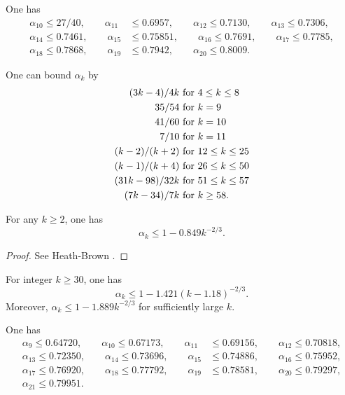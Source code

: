 \begin{theorem}\cite{ivic_ouellet_1989} One has
\begin{align*}
\alpha_{10} \le 27/40,\qquad \alpha_{11} &\le 0.6957,\qquad \alpha_{12} \le 0.7130,\qquad \alpha_{13} \le 0.7306,\\
\alpha_{14} \le 0.7461,\qquad \alpha_{15} &\le 0.75851,\qquad \alpha_{16} \le 0.7691,\qquad \alpha_{17} \le 0.7785,\\
\alpha_{18} \le 0.7868,\qquad \alpha_{19} &\le 0.7942,\qquad \alpha_{20} \le 0.8009.
\end{align*}
\end{theorem}
\begin{theorem}\cite[Theorem 13.12]{ivic}  One can bound $\alpha_k$ by
    \begin{align*}
        (3k-4)/4k & \hbox{ for } 4 \leq k \leq 8 \\
        35/54 & \hbox{ for } k = 9 \\
        41/60 & \hbox{ for } k = 10 \\
        7/10 & \hbox{ for } k = 11 \\
        (k-2)/(k+2) & \hbox{ for } 12 \leq k \leq 25 \\
        (k-1)/(k+4) & \hbox{ for } 26 \leq k \leq 50 \\
        (31k-98)/32k & \hbox{ for } 51 \leq k \leq 57 \\
        (7k-34)/7k & \hbox{ for } k \geq 58.
    \end{align*}
\end{theorem}

\begin{lemma}\label{hb-alpha-large}
For any $k \ge 2$, one has
\[
\alpha_k \le 1 - 0.849k^{-2/3}.
\]
\end{lemma}
\begin{proof}
See Heath-Brown \cite{heathbrown_new_2017}.
\end{proof}

\begin{theorem}For integer $k \ge 30$, one has
\[
\alpha_k \leq 1 - 1.421(k - 1.18)^{-2/3}.
\]
Moreover, $\alpha_k \leq 1 - 1.889k^{-2/3}$ for sufficiently large $k$.
\end{theorem}

\begin{theorem}One has
\begin{align*}
\alpha_{9} \le 0.64720,\qquad \alpha_{10} \le 0.67173,\qquad \alpha_{11} &\le 0.69156,\qquad \alpha_{12} \le 0.70818,\\
\alpha_{13} \le 0.72350, \qquad \alpha_{14} \le 0.73696,\qquad \alpha_{15} &\le 0.74886,\qquad \alpha_{16} \le 0.75952,\\
\alpha_{17} \le 0.76920, \qquad \alpha_{18} \le 0.77792,\qquad \alpha_{19} &\le 0.78581,\qquad \alpha_{20} \le 0.79297,\\
\alpha_{21} \le 0.79951.
\end{align*}
\end{theorem}

